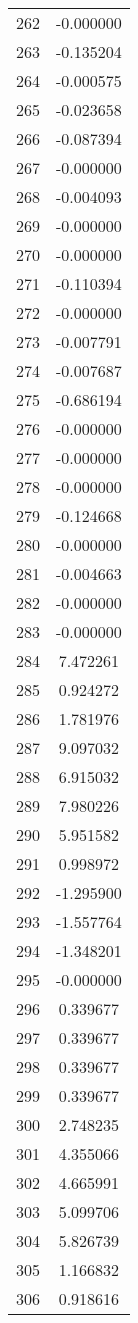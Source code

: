 \documentclass[12pt]{article}
\begin{document}
\begin{longtable}{@{}cc@{}}
262 & -0.000000 \\
263 & -0.135204 \\
264 & -0.000575 \\
265 & -0.023658 \\
266 & -0.087394 \\
267 & -0.000000 \\
268 & -0.004093 \\
269 & -0.000000 \\
270 & -0.000000 \\
271 & -0.110394 \\
272 & -0.000000 \\
273 & -0.007791 \\
274 & -0.007687 \\
275 & -0.686194 \\
276 & -0.000000 \\
277 & -0.000000 \\
278 & -0.000000 \\
279 & -0.124668 \\
280 & -0.000000 \\
281 & -0.004663 \\
282 & -0.000000 \\
283 & -0.000000 \\
284 & 7.472261 \\
285 & 0.924272 \\
286 & 1.781976 \\
287 & 9.097032 \\
288 & 6.915032 \\
289 & 7.980226 \\
290 & 5.951582 \\
291 & 0.998972 \\
292 & -1.295900 \\
293 & -1.557764 \\
294 & -1.348201 \\
295 & -0.000000 \\
296 & 0.339677 \\
297 & 0.339677 \\
298 & 0.339677 \\
299 & 0.339677 \\
300 & 2.748235 \\
301 & 4.355066 \\
302 & 4.665991 \\
303 & 5.099706 \\
304 & 5.826739 \\
305 & 1.166832 \\
306 & 0.918616 \\

\end{longtable}
\end{document}
